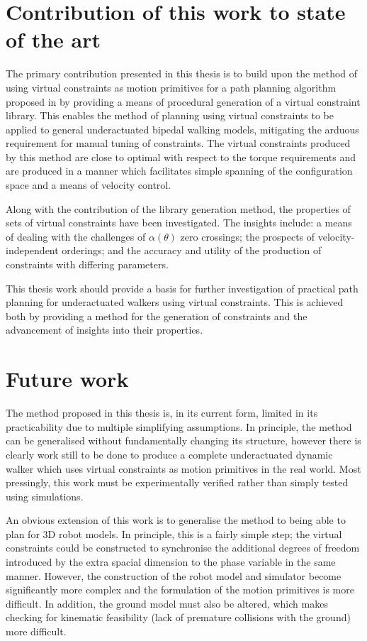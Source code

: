 \section{Contribution of this work to state of the art}
The primary contribution presented in this thesis is to build upon the method of using virtual constraints as motion primitives for a path planning algorithm proposed in \cite{manchester13planning} by providing a means of procedural generation of a virtual constraint library. This enables the method of planning using virtual constraints to be applied to general underactuated bipedal walking models, mitigating the arduous requirement for manual tuning of constraints. The virtual constraints produced by this method are close to optimal with respect to the torque requirements and are produced in a manner which facilitates simple spanning of the configuration space and a means of velocity control.

Along with the contribution of the library generation method, the properties of sets of virtual constraints have been investigated. The insights include: a means of dealing with the challenges of $\alpha(\theta)$ zero crossings; the prospects of velocity-independent orderings; and the accuracy and utility of the production of constraints with differing parameters.

This thesis work should provide a basis for further investigation of practical path planning for underactuated walkers using virtual constraints. This is achieved both by providing a method for the generation of constraints and the advancement of insights into their properties.

\section{Future work}
The method proposed in this thesis is, in its current form, limited in its practicability due to multiple simplifying assumptions. In principle, the method can be generalised without fundamentally changing its structure, however there is clearly work still to be done to produce a complete underactuated dynamic walker which uses virtual constraints as motion primitives in the real world. Most pressingly, this work must be experimentally verified rather than simply tested using simulations.

An obvious extension of this work is to generalise the method to being able to plan for 3D robot models. In principle, this is a fairly simple step; the virtual constraints could be constructed to synchronise the additional degrees of freedom introduced by the extra spacial dimension to the phase variable in the same manner. However, the construction of the robot model and simulator become significantly more complex and the formulation of the motion primitives is more difficult. In addition, the ground model must also be altered, which makes checking for kinematic feasibility (lack of premature collisions with the ground) more difficult. 

